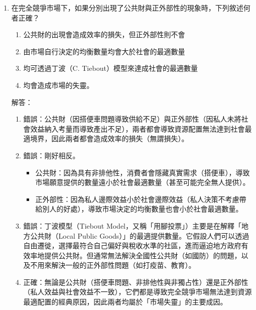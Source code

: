 \documentclass[12pt, a4paper]{article}
\begin{document}
\begin{enumerate}
    \item 在完全競爭市場下，如果分別出現了公共財與正外部性的現象時，下列敘述何者正確？
    \begin{enumerate}[label=\Alph*.]
        \item 公共財的出現會造成效率的損失，但正外部性則不會
        \item 由市場自行決定的均衡數量均會大於社會的最適數量
        \item 均可透過丁波（C. Tiebout）模型來達成社會的最適數量
        \item 均會造成市場的失靈。
    \end{enumerate}
    解答：
    \begin{enumerate}[label=\Alph*.]
        \item 錯誤：公共財（因搭便車問題導致供給不足）與正外部性（因私人未將社會效益納入考量而導致產出不足），兩者都會導致資源配置無法達到社會最適境界，因此兩者都會造成效率的損失（無謂損失）。
        \item  錯誤：剛好相反。
            \begin{itemize}
                \item 公共財：因為具有非排他性，消費者會隱藏真實需求（搭便車），導致市場願意提供的數量遠小於社會最適數量（甚至可能完全無人提供）。
                \item 正外部性：因為私人邊際效益小於社會邊際效益（私人決策不考慮帶給別人的好處），導致市場決定的均衡數量也會小於社會最適數量。
            \end{itemize}
        \item 錯誤：丁波模型（Tiebout Model，又稱「用腳投票」）主要是在解釋「地方公共財（Local Public Goods）」的最適提供數量。它假設人們可以透過自由遷徙，選擇最符合自己偏好與稅收水準的社區，進而逼迫地方政府有效率地提供公共財。但通常無法解決全國性公共財（如國防）的問題，以及不用來解決一般的正外部性問題（如打疫苗、教育）。
        \item 正確：無論是公共財（搭便車問題、非排他性與非獨占性）還是正外部性（私人效益與社會效益不一致），它們都是導致完全競爭市場無法達到資源最適配置的經典原因，因此兩者均屬於「市場失靈」的主要成因。
    \end{enumerate}


\end{enumerate}
\end{document}
